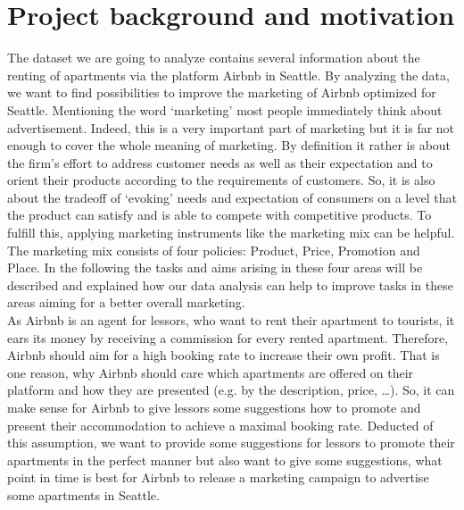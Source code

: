 \documentclass[journal]{IEEEtran}
\begin{document}
\section{Project background and motivation}
 The dataset we are going to analyze contains several information about the renting of apartments via the platform Airbnb in Seattle. By analyzing the data, we want to find possibilities to improve the marketing of Airbnb optimized for Seattle. Mentioning the word ‘marketing’ most people immediately think about advertisement. Indeed, this is a very important part of marketing but it is far not enough to cover the whole meaning of marketing. By definition it rather is about the firm’s effort to address customer needs as well as their expectation and to orient their products according to the requirements of customers. So, it is also about the tradeoff of ‘evoking’ needs and expectation of consumers on a level that the product can satisfy and is able to compete with competitive products. To fulfill this, applying marketing instruments like the marketing mix can be helpful. The marketing mix consists of four policies: Product, Price, Promotion and Place. In the following the tasks and aims arising in these four areas will be described and explained how our data analysis can help to improve tasks in these areas aiming for a better overall marketing.\\As Airbnb is an agent for lessors, who want to rent their apartment to tourists, it ears its money by receiving a commission for every rented apartment. Therefore, Airbnb should aim for a high booking rate to increase their own profit. That is one reason, why Airbnb should care which apartments are offered on their platform and how they are presented (e.g. by the description, price, …). So, it can make sense for Airbnb to give lessors some suggestions how to promote and present their accommodation to achieve a maximal booking rate. Deducted of this assumption, we want to provide some suggestions for lessors to promote their apartments in the perfect manner but also want to give some suggestions, what point in time is best for Airbnb to release a marketing campaign to advertise some apartments in Seattle. 
\end{document}

